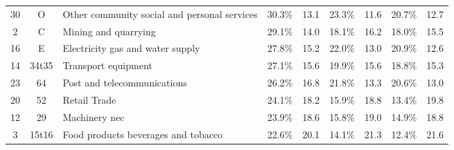 \documentclass[10pt]{article}
\begin{document}
\begin{table}[!h]
{\begin{tabular}{cc|lcccccc}
30                                & O                         & \multicolumn{1}{l|}{Other community social and personal services}                           & 30.3\% & \multicolumn{1}{c|}{13.1}                        & 23.3\% & \multicolumn{1}{c|}{11.6}                        & 20.7\%              & 12.7              \\
2                                 & C                         & \multicolumn{1}{l|}{Mining and quarrying}                                                   & 29.1\% & \multicolumn{1}{c|}{14.0}                        & 18.1\% & \multicolumn{1}{c|}{16.2}                        & 18.0\%              & 15.5              \\
16                                & E                         & \multicolumn{1}{l|}{Electricity gas and water supply}                                       & 27.8\% & \multicolumn{1}{c|}{15.2}                        & 22.0\% & \multicolumn{1}{c|}{13.0}                        & 20.9\%              & 12.6              \\
14                                & 34t35                     & \multicolumn{1}{l|}{Transport equipment}                                                    & 27.1\% & \multicolumn{1}{c|}{15.6}                        & 19.9\% & \multicolumn{1}{c|}{15.6}                        & 18.8\%              & 15.3              \\
23                                & 64                        & \multicolumn{1}{l|}{Post and telecommunications}                                            & 26.2\% & \multicolumn{1}{c|}{16.8}                        & 21.8\% & \multicolumn{1}{c|}{13.3}                        & 20.6\%              & 13.0              \\
20                                & 52                        & \multicolumn{1}{l|}{Retail Trade}                                                           & 24.1\% & \multicolumn{1}{c|}{18.2}                        & 15.9\% & \multicolumn{1}{c|}{18.8}                        & 13.4\%              & 19.8              \\
12                                & 29                        & \multicolumn{1}{l|}{Machinery nec}                                                          & 23.9\% & \multicolumn{1}{c|}{18.6}                        & 15.8\% & \multicolumn{1}{c|}{19.0}                        & 14.9\%              & 18.8              \\
3                                 & 15t16                     & \multicolumn{1}{l|}{Food products beverages and tobacco}                                    & 22.6\% & \multicolumn{1}{c|}{20.1}                        & 14.1\% & \multicolumn{1}{c|}{21.3}                        & 12.4\%              & 21.6              \\

\end{tabular}}
\end{table}
\end{document}
